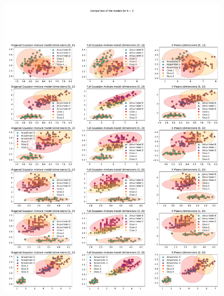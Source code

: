 \documentclass[a4paper, 11pt]{report}
\begin{document}
\begin{enumerate}
        \begin{figure}
            \centering
            \includegraphics[width=1\textwidth]{probabilistic_graphical_models/HW2/images/iris_GM_KM_3.pdf}
            \caption{}
            \label{fig:iris3}
        \end{figure}
        

\end{enumerate}
\end{document}

